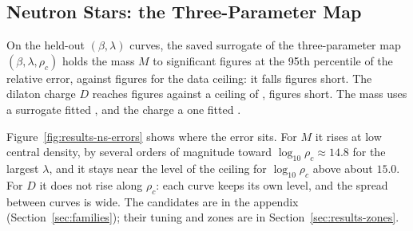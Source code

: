 \subsection{Neutron Stars: the Three-Parameter Map}
\label{sec:results-ns}

On the held-out $(\beta, \lambda)$ curves, the saved surrogate of the three-parameter map $(\beta, \lambda, \rho_c)$ holds the mass $M$ to \resultsNsMassTest{} significant figures at the 95th percentile of the relative error, against \resultsNsMassCeiling{} figures for the data ceiling: it falls \resultsNsMassGap{} figures short.
The dilaton charge $D$ reaches \resultsNsChargeTest{} figures against a ceiling of \resultsNsChargeCeiling{}, \resultsNsChargeGap{} figures short.
The mass uses a \resultsNsMassFamily{} surrogate fitted \resultsNsMassUnit{}, and the charge a \resultsNsChargeFamily{} one fitted \resultsNsChargeUnit{}.

Figure~\ref{fig:results-ns-errors} shows where the error sits.
For $M$ it rises at low central density, by several orders of magnitude toward $\log_{10}\rho_c \approx 14.8$ for the largest $\lambda$, and it stays near the level of the ceiling for $\log_{10}\rho_c$ above about $15.0$.
For $D$ it does not rise along $\rho_c$: each curve keeps its own level, and the spread between curves is wide.
The candidates are in the appendix (Section~\ref{sec:families}); their tuning and zones are in Section~\ref{sec:results-zones}.

